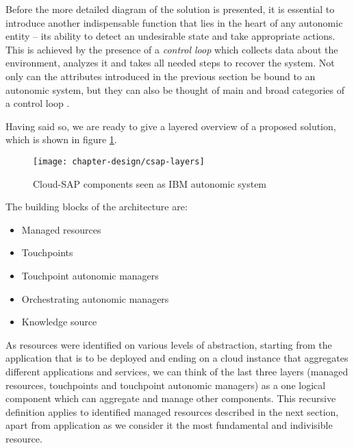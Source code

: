 Before the more detailed diagram of the solution is presented, it is essential to introduce another indispensable function that lies in the heart of any autonomic entity -- its ability to detect an undesirable state and take appropriate actions. This is achieved by the presence of a \emph{control loop} which collects data about the environment, analyzes it and takes all needed steps to recover the system. Not only can the attributes introduced in the previous section be bound to an autonomic system, but they can also be thought of main and broad categories of a control loop \cite{IBM06}.

Having said so, we are ready to give a layered overview of a proposed solution, which is shown in figure \ref{img:csap-layered-structure}.
\begin{figure}[!ht]
  \begin{center}
    \texttt{[image: chapter-design/csap-layers]}
  \end{center}
  \caption{Cloud-SAP components seen as IBM autonomic system \cite{IBM06}}
  \label{img:csap-layered-structure}
\end{figure}

The building blocks of the architecture are:
\begin{itemize}
  \item Managed resources
  \item Touchpoints
  \item Touchpoint autonomic managers
  \item Orchestrating autonomic managers
  \item Knowledge source
\end{itemize}
As resources were identified on various levels of abstraction, starting from the application that is to be deployed and ending on a cloud instance that aggregates different applications and services, we can think of the last three layers (managed resources, touchpoints and touchpoint autonomic managers) as a one logical component which can aggregate and manage other components. This recursive definition applies to identified managed resources described in the next section, apart from application as we consider it the most fundamental and indivisible resource.

